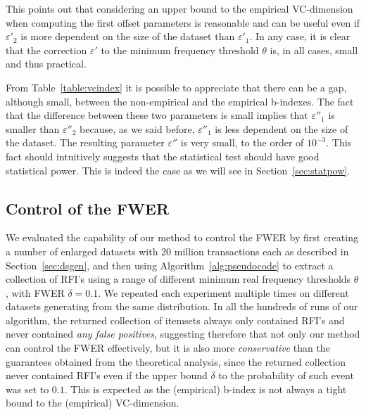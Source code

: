 This points out that considering an upper bound to the empirical VC-dimension
when computing the first offset parameters is reasonable and can be useful even
if $\varepsilon'_2$ is more dependent on the size of the dataset than
$\varepsilon'_1$. In any case, it is clear that the correction $\varepsilon'$
to the minimum frequency threshold $\theta$ is, in all cases, small and thus
practical.  %

From Table~\ref{table:vcindex} it is possible to appreciate that there can be a
gap, although small, between the non-empirical and the empirical b-indexes. The fact that the difference
between these two parameters is small implies that $\varepsilon''_1$ is smaller
than $\varepsilon''_2$ because, as we said before, $\varepsilon''_1$ is less dependent on the size of
the dataset. The resulting parameter $\varepsilon''$ is very small, to the order
of $10^{-3}$. This fact should intuitively suggests that the statistical test
should have good statistical power. This is indeed the case as we will see
in Section~\ref{sec:statpow}.

\subsection{Control of the FWER}
We evaluated the capability of our method to control the FWER by first creating
a number of enlarged datasets with 20 million transactions
each as described in Section~\ref{sec:dsgen}, and then using
Algorithm~\ref{alg:pseudocode} to extract a collection of RFI's using a range of
different minimum real frequency thresholds $\theta$, with FWER $\delta=0.1$. We
repeated each experiment multiple times on different datasets generating from the same
distribution. In all the hundreds of runs of our algorithm, the returned
collection of itemsets always only contained RFI's and never contained \emph{any false positives},
suggesting therefore that not only our method can control the FWER effectively,
but it is also more \emph{conservative} than the guarantees obtained from the theoretical analysis, since the returned collection never contained RFI's even if the upper bound $\delta$ to the probability of such event was set to $0.1$. This is
expected as the (empirical) b-index is not always a tight bound to the
(empirical) VC-dimension.

